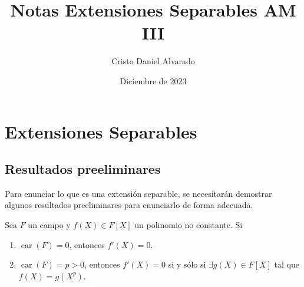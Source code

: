 \documentclass[12pt]{report}
\theoremstyle{largebreak}
\DeclareMathOperator{\car}{car}
\begin{document}
    \title{Notas Extensiones Separables AM III}
    \author{Cristo Daniel Alvarado}
    \date{Diciembre de 2023}
    \maketitle

    \tableofcontents %

    \setcounter{chapter}{3} %
    
    \chapter{Extensiones Separables}
    
    \section{Resultados preeliminares}
    
    Para enunciar lo que es una extensión separable, se necesitarán demostrar algunos resultados preeliminares para enunciarlo de forma adecuada.

    \begin{propo}
        Sea $F$ un campo y $f(X)\in F[X]$ un polinomio no constante. Si
        \begin{enumerate}
            \item $\car(F)=0$, entonces $f'(X)=0$. \label{F_1}
            \item $\car(F)=p>0$, entonces $f'(X)=0$  si y sólo si $\exists g(X)\in F[X]$ tal que $f(X)=g(X^{p})$. \label{F_2}
        \end{enumerate}
    \end{propo}
\end{document}
